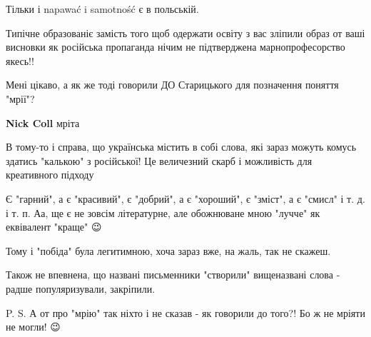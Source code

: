 \begin{itemize}
Тільки і napawać i samotność є в польській.

 

Типічне образованіє замість того щоб одержати освіту з вас зліпили образ от
ваші висновки як російська пропаганда нічим не підтверджена марнопрофесорство
якесь!!


 

Мені цікаво, а як же тоді говорили ДО Старицького для позначення поняття
"мрії"?


\begin{itemize}
 
\textbf{Nick Coll} мріта
\end{itemize}

 

В тому-то і справа, що українська містить в собі слова, які зараз можуть комусь
здатись "калькою" з російської! Це величезний скарб і можливість для
креативного підходу \Smiley[1.0][yellow]

Є "гарний", а є "красивий", є "добрий", а є "хороший", є "зміст", а є "смисл" і
т. д. і т. п. Аа, ще є не зовсім літературне, але обожнюване мною "лучче" як
еквівалент "краще" 😉

Тому і "побіда" була легитимною, хоча зараз вже, на жаль, так не скажеш.

Також не впевнена, що названі письменники "створили" вищеназвані слова - радше
популяризували, закріпили.

P. S. А от про "мрію" так ніхто і не сказав - як говорили до того?! Бо ж не
мріяти не могли! 😉


\end{itemize}
